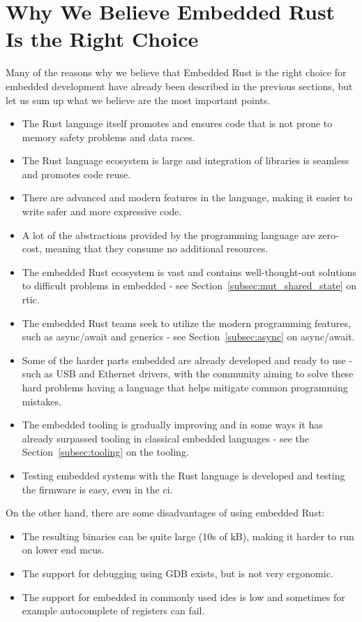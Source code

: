 \section{Why We Believe Embedded Rust Is the Right Choice}
\label{sec:embedded_rust_reasoning}
Many of the reasons why we believe that Embedded Rust is the right choice for embedded development have already been described in the previous sections, but let us sum up what we believe are the most important points.
\begin{itemize}
    \item The Rust language itself promotes and ensures code that is not prone to memory safety problems and data races.
    \item The Rust language ecosystem is large and integration of libraries is seamless and promotes code reuse.
    \item There are advanced and modern features in the language, making it easier to write safer and more expressive code.
    \item A lot of the abstractions provided by the programming language are zero-cost, meaning that they consume no additional resources.
    \item The embedded Rust ecosystem is vast and contains well-thought-out solutions to difficult problems in embedded - see Section~\ref{subsec:mut_shared_state} on \acs{rtic}.
    \item The embedded Rust teams seek to utilize the modern programming features, such as async/await and generics - see Section~\ref{subsec:async} on async/await.
    \item Some of the harder parts embedded are already developed and ready to use - such as USB and Ethernet drivers, with the community aiming to solve these hard problems having a language that helps mitigate common programming mistakes.
    \item The embedded tooling is gradually improving and in some ways it has already surpassed tooling in classical embedded languages - see the Section~\ref{subsec:tooling} on the tooling.
    \item Testing embedded systems with the Rust language is developed and testing the firmware is easy, even in the \acs{ci}.
\end{itemize}

On the other hand, there are some disadvantages of using embedded Rust:
\begin{itemize}
    \item The resulting binaries can be quite large (10s of kB), making it harder to run on lower end \acs{mcu}s.
    \item The support for debugging using GDB exists, but is not very ergonomic.
    \item The support for embedded in commonly used \acs{ide}s is low and sometimes for example autocomplete of registers can fail.
\end{itemize}

